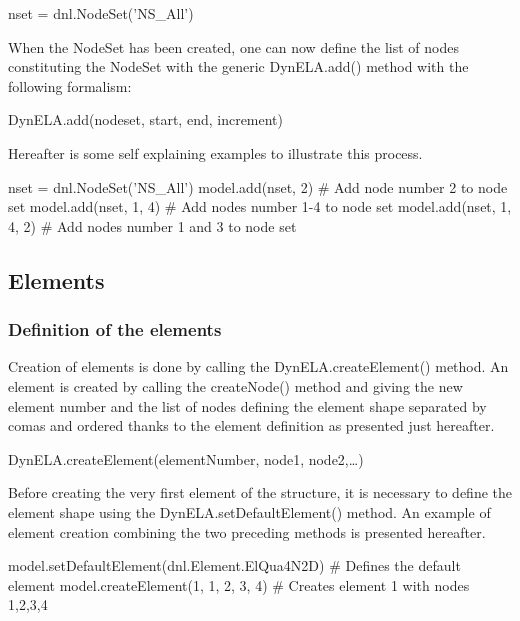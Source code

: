 \begin{PythonListing}
nset = dnl.NodeSet('NS_All')
\end{PythonListing}

When the \textsf{NodeSet} has been created, one can now define the list of nodes constituting the \textsf{NodeSet} with the generic \textsf{DynELA.add()} method with the following formalism:

\textsf{DynELA.add(nodeset, start, end, increment)}

Hereafter is some self explaining examples to illustrate this process.

\begin{PythonListing}
nset = dnl.NodeSet('NS_All')
model.add(nset, 2)       # Add node number 2 to node set
model.add(nset, 1, 4)    # Add nodes number 1-4 to node set
model.add(nset, 1, 4, 2) # Add nodes number 1 and 3 to node set
\end{PythonListing}

\subsection{Elements}

\subsubsection{Definition of the elements}

Creation of elements is done by calling the \textsf{DynELA.createElement()} method. An element is created by calling the \textsf{createNode()} method and giving the new element number and the list of nodes defining the element shape separated by comas and ordered thanks to the element definition as presented just hereafter.

\textsf{DynELA.createElement(elementNumber, node1, node2,\ldots)}

Before creating the very first element of the structure, it is necessary to define the element shape using the \textsf{DynELA.setDefaultElement()} method. An example of element creation combining the two preceding methods is presented hereafter.

\begin{PythonListing}
model.setDefaultElement(dnl.Element.ElQua4N2D) # Defines the default element
model.createElement(1, 1, 2, 3, 4)             # Creates element 1 with nodes 1,2,3,4
\end{PythonListing}

